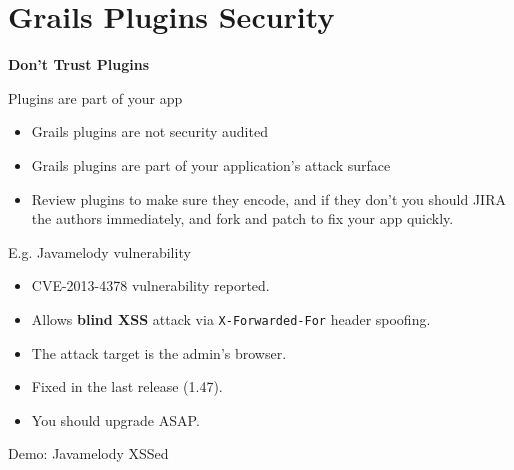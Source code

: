 
\section{Grails Plugins Security}

{
\begin{frame}[plain]
    \begin{center}
      \Huge\bfseries
      Don't Trust Plugins
    \end{center}
\end{frame}
}

\begin{frame}[plain]{Plugins are part of your app}
  \begin{itemize}%
    \item Grails plugins are not security audited
    \item Grails plugins are part of your application's attack surface
    \item Review plugins to make sure they encode, and if they don't you should JIRA the authors immediately, and fork and patch to fix your app quickly.
  \end{itemize}
\end{frame}

\begin{frame}{E.g. Javamelody vulnerability}
  \begin{itemize}%
    \item CVE-2013-4378 vulnerability reported.
    \item Allows \textbf{blind XSS} attack via \verb|X-Forwarded-For| header spoofing.
    \item The attack target is the admin's browser.
    \item Fixed in the last release (1.47).
    \item You should upgrade ASAP.
  \end{itemize}
\end{frame}

\begin{frame}{Demo: Javamelody XSSed}
  \begin{center}

  \end{center}

\end{frame}
